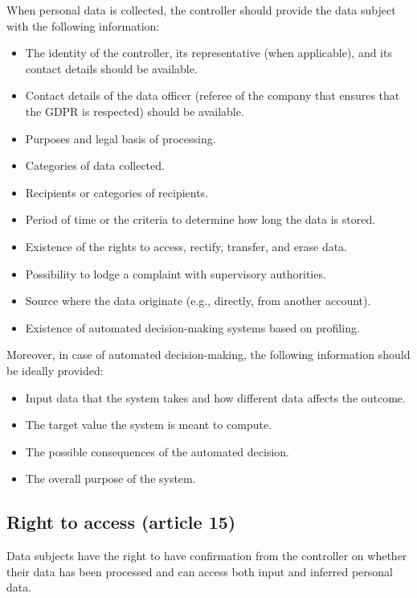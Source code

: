 When personal data is collected, the controller should provide the data subject with the following information:
\begin{itemize}
    \item The identity of the controller, its representative (when applicable), and its contact details should be available.
    \item Contact details of the data officer (referee of the company that ensures that the GDPR is respected) should be available.
    \item Purposes and legal basis of processing.
    \item Categories of data collected.
    \item Recipients or categories of recipients.
    \item Period of time or the criteria to determine how long the data is stored.
    \item Existence of the rights to access, rectify, transfer, and erase data.
    \item Possibility to lodge a complaint with supervisory authorities.
    \item Source where the data originate (e.g., directly, from another account).
    \item Existence of automated decision-making systems based on profiling.
\end{itemize}

Moreover, in case of automated decision-making, the following information should be ideally provided:
\begin{itemize}
    \item Input data that the system takes and how different data affects the outcome.
    \item The target value the system is meant to compute.
    \item The possible consequences of the automated decision.
    \item The overall purpose of the system.
\end{itemize} 


\subsection{Right to access (article 15)} 

Data subjects have the right to have confirmation from the controller on whether their data has been processed and can access both input and inferred personal data.

